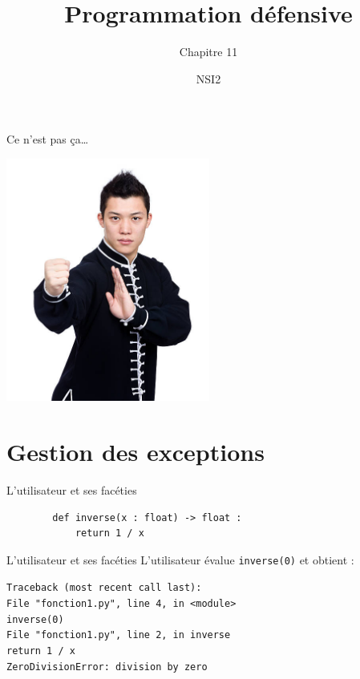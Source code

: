 \documentclass[10pt]{nsibeamer}
\title{Programmation défensive}
\subtitle{Chapitre 11}
\author{NSI2}
\begin{document}
\maketitle

\begin{frame}{Ce n'est pas ça\ldots}
    \begin{center}
    \includegraphics[height=8cm]{img/kf.jpg}
    \end{center}
\end{frame}
\section{Gestion des exceptions}


\begin{frame}[fragile]{L'utilisateur et ses facéties}
    \begin{verbatim}
        def inverse(x : float) -> float :
            return 1 / x
        \end{verbatim}
\end{frame}



\begin{frame}[fragile]{L'utilisateur et ses facéties}
    L'utilisateur évalue \texttt{inverse(0)} et obtient :\\\pause
    
    {\color{red}\texttt{Traceback (most recent call last):\\
            \hspace{2em}File "fonction1.py", line 4, in <module>\\
            \hspace{4em}inverse(0)\\
            \hspace{2em}File "fonction1.py", line 2, in inverse\\
            \hspace{4em}return 1 / x\\
            ZeroDivisionError: division by zero}}
\end{frame}
\end{document}
